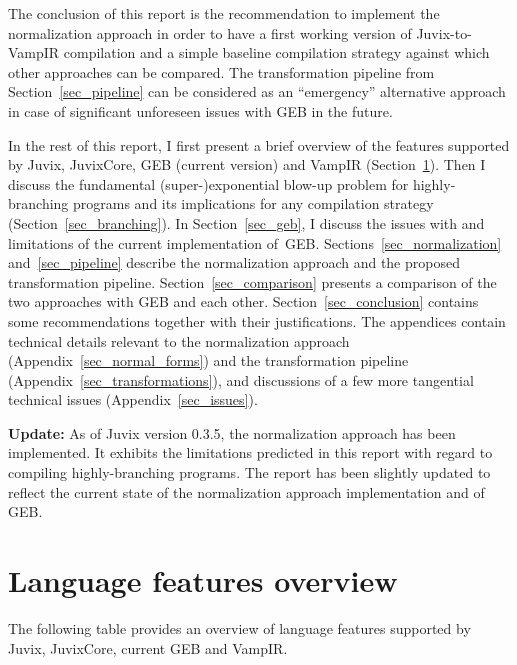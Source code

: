 The conclusion of this report is the recommendation to implement the
normalization approach in order to have a first working version of
Juvix-to-VampIR compilation and a simple baseline compilation strategy
against which other approaches can be compared. The transformation
pipeline from Section~\ref{sec_pipeline} can be considered as an
``emergency'' alternative approach in case of significant unforeseen
issues with GEB in the future.

In the rest of this report, I first present a brief overview of the
features supported by Juvix, JuvixCore, GEB (current version) and
VampIR (Section~\ref{sec_features}). Then I discuss the fundamental
(super-)exponential blow-up problem for highly-branching programs and
its implications for any compilation strategy
(Section~\ref{sec_branching}). In Section~\ref{sec_geb}, I discuss the
issues with and limitations of the current implementation
of~GEB. Sections~\ref{sec_normalization} and~\ref{sec_pipeline}
describe the normalization approach and the proposed transformation
pipeline. Section~\ref{sec_comparison} presents a comparison of the
two approaches with GEB and each other. Section~\ref{sec_conclusion}
contains some recommendations together with their justifications. The
appendices contain technical details relevant to the normalization
approach (Appendix~\ref{sec_normal_forms}) and the transformation
pipeline (Appendix~\ref{sec_transformations}), and discussions of a
few more tangential technical issues (Appendix~\ref{sec_issues}).

{\bf Update:} As of Juvix version 0.3.5, the normalization approach
has been implemented. It exhibits the limitations predicted in this
report with regard to compiling highly-branching programs. The report
has been slightly updated to reflect the current state of the
normalization approach implementation and of GEB.

\section{Language features overview}\label{sec_features}

The following table provides an overview of language features
supported by Juvix, JuvixCore, current GEB and VampIR.

